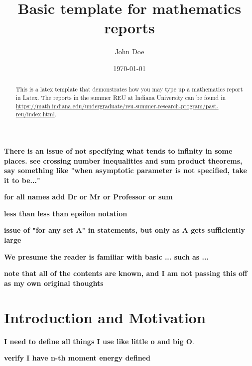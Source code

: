 \documentclass[12pt]{amsart}
\begin{document}
\title{Basic template for mathematics reports} 

\author[Doe]{John Doe}
\address{Department of Mathematics\\
         Research Institution,
         City, State XXXXX
         Country} 
\date{\today}

\begin{abstract}
This is a latex template that demonstrates how you may type up a mathematics report in Latex. The reports in the summer REU at Indiana University can be found in \url{https://math.indiana.edu/undergraduate/reu-summer-research-program/past-reu/index.html}.

\end{abstract}

\maketitle


\textbf{There is an issue of not specifying what tends to infinity in some places. see crossing number inequalities and sum product theorems, say something like "when asymptotic parameter is not specified, take it to be..."}

\textbf{for all names add Dr or Mr or Professor or sum}

\textbf{less than less than epsilon notation}

\textbf{issue of "for any set A" in statements, but only as A gets sufficiently large}

\textbf{We presume the reader is familiar with basic ... such as ... }

\textbf{note that all of the contents are known, and I am not passing this off as my own original thoughts}

\section{Introduction and Motivation} 

\textbf{I need to define all things I use like little o and big O}.

\textbf{verify I have n-th moment energy defined}
\end{document}

